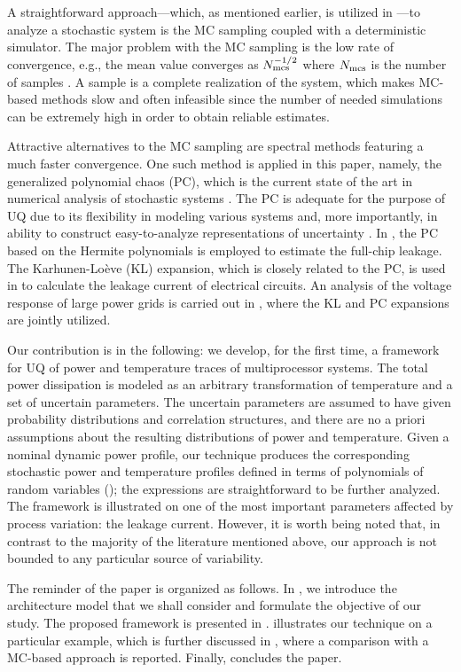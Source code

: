 A straightforward approach---which, as mentioned earlier, is utilized in \cite{chandra2010}---to analyze a stochastic system is the MC sampling coupled with a deterministic simulator. The major problem with the MC sampling is the low rate of convergence, e.g., the mean value converges as $N_\text{mcs}^{-{{1}/{2}}}$ where $N_\text{mcs}$ is the number of samples \cite{xiu2010, maitre2010}. A sample is a complete realization of the system, which makes MC-based methods slow and often infeasible since the number of needed simulations can be extremely high in order to obtain reliable estimates.

Attractive alternatives to the MC sampling are spectral methods \cite{xiu2010, maitre2010, ghanem1991} featuring a much faster convergence. One such method is applied in this paper, namely, the generalized polynomial chaos (PC), which is the current state of the art in numerical analysis of stochastic systems \cite{xiu2010}. The PC is adequate for the purpose of UQ due to its flexibility in modeling various systems and, more importantly, in ability to construct easy-to-analyze representations of uncertainty \cite{eldred2009}. In \cite{shen2009}, the PC based on the Hermite polynomials is employed to estimate the full-chip leakage. The Karhunen-Lo\`{e}ve (KL) expansion, which is closely related to the PC, is used in \cite{bhardwaj2006} to calculate the leakage current of electrical circuits. An analysis of the voltage response of large power grids is carried out in \cite{ghanta2006}, where the KL and PC expansions are jointly utilized.

Our contribution is in the following: we develop, for the first time, a framework for UQ of power and temperature traces of multiprocessor systems. The total power dissipation is modeled as an arbitrary transformation of temperature and a set of uncertain parameters. The uncertain parameters are assumed to have given probability distributions and correlation structures, and there are no a priori assumptions about the resulting distributions of power and temperature. Given a nominal dynamic power profile, our technique produces the corresponding stochastic power and temperature profiles defined in terms of polynomials of random variables (\rvs); the expressions are straightforward to be further analyzed. The framework is illustrated on one of the most important parameters affected by process variation: the leakage current. However, it is worth being noted that, in contrast to the majority of the literature mentioned above, our approach is not bounded to any particular source of variability.

The reminder of the paper is organized as follows. In , we introduce the architecture model that we shall consider and formulate the objective of our study. The proposed framework is presented in .  illustrates our technique on a particular example, which is further discussed in , where a comparison with a MC-based approach is reported. Finally,  concludes the paper.
